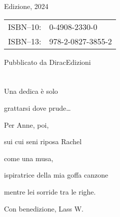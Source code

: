 {\begin{flushleft}
\begin{justify}
{		\bigskip
		
		\textonesuperior Edizione, 2024
		
		\bigskip
		
		\begin{tabular}{rl}
			ISBN--10:& 0-4908-2330-0\\ 
			ISBN--13:& 978-2-0827-3855-2\\ 
		\end{tabular}	
		
		\bigskip
		
		Pubblicato da DiracEdizioni 
		}
	\end{justify}
\end{flushleft}

\let\cleardoublepage\clearpage

\chapter*{\phantom{DEDICA}}


	\begin{dedica}
		Una dedica è solo
		
		grattarsi dove prude\ldots{}
		
		Per Anne, poi,
		
		sui cui seni riposa Rachel
		
		come una musa,
		
		ispiratrice della mia goffa canzone
		
		mentre lei sorride tra le righe.
		
		Con benedizione, Lass W.
	\end{dedica}
}

\frontmatter


